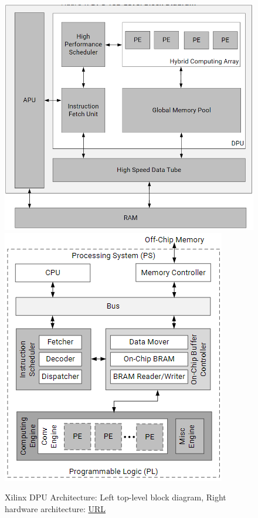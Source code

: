 \begin{figure} [H]
	\centering
	\includegraphics[scale=0.35]{Images/Hardware/dpu-top-block-diagram.png}
	\includegraphics[scale=0.6]{Images/Hardware/dpu-hardware-architecture.png}
	\decoRule
	\caption[Xilinx DPU Architecture]{Xilinx DPU Architecture: Left top-level block diagram, Right hardware architecture: \href{https://www.xilinx.com/support/documentation/ip_documentation/dpu/v3_2/pg338-dpu.pdf}{URL}}
	\label{fig:dpu-top-block-diagram}
\end{figure}

